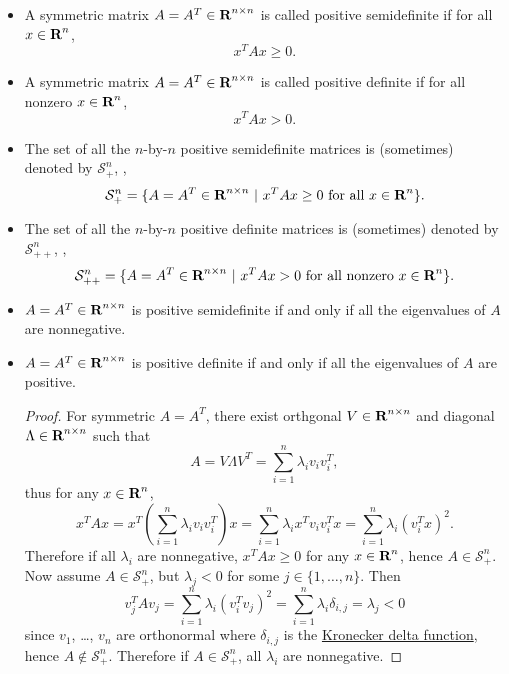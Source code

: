 \documentclass[10pt, twoside]{book}   	%
\newcommand{\possemidefset}[1]{\mathcal{S}_+^{#1}}
\newcommand{\posdefset}[1]{\mathcal{S}_{++}^{#1}}
\begin{document}
\begin{itemize}

\item
A symmetric matrix $A=A^T\in{\mbox{\bf R}}^{n\times n}$ is called positive semidefinite if for all $x\in{\mbox{\bf R}}^n$,
\begin{equation}
x^T A x \geq 0.
\end{equation}

\item
A symmetric matrix $A=A^T\in{\mbox{\bf R}}^{n\times n}$ is called positive definite if for all nonzero $x\in{\mbox{\bf R}}^n$,
\begin{equation}
x^T A x > 0.
\end{equation}

\item The set of all the $n$-by-$n$ positive semidefinite matrices is (sometimes) denoted by $\possemidefset{n}$,
\ie,
\begin{equation}
\possemidefset{n} = \set{A=A^T\in\reals^{n\times n}}{x^T A x \geq 0 \mbox{ for all } x \in \reals^n}.
\end{equation}

\item The set of all the $n$-by-$n$ positive definite matrices is (sometimes) denoted by $\posdefset{n}$,
\ie,
\begin{equation}
\posdefset{n} = \set{A=A^T\in\reals^{n\times n}}{x^T A x > 0 \mbox{ for all nonzero } x \in \reals^n}.
\end{equation}

\item $A=A^T\in{\mbox{\bf R}}^{n\times n}$ is positive semidefinite if and only if all the eigenvalues of $A$ are nonnegative.

\item $A=A^T\in{\mbox{\bf R}}^{n\times n}$ is positive definite if and only if all the eigenvalues of $A$ are positive.

\begin{proof}
For symmetric $A=A^T$, there exist orthgonal $V\in{\mbox{\bf R}}^{n\times n}$ and diagonal $\Lambda\in{\mbox{\bf R}}^{n\times n}$
such that
\[
A = V \Lambda V^T = \sum_{i=1}^n \lambda_i v_i v_i^T,
\]
thus for any $x\in{\mbox{\bf R}}^n$,
\[
x^T A x = x^T \left(\sum_{i=1}^n \lambda_i v_i v_i^T \right) x
= \sum_{i=1}^n \lambda_i x^T v_i v_i^T x
= \sum_{i=1}^n \lambda_i (v_i^T x)^2.
\]
Therefore if all $\lambda_i$ are nonnegative, $x^T A x\geq0$ for any $x\in{\mbox{\bf R}}^n$, hence $A\in\possemidefset{n}$.
Now assume $A\in\possemidefset{n}$, but $\lambda_j < 0$ for some $j\in\{1,\ldots,n\}$.
Then
\begin{equation}
v_j^T A v_j
= \sum_{i=1}^n \lambda_i (v_i^T v_j)^2
= \sum_{i=1}^n \lambda_i \delta_{i,j}
= \lambda_j < 0
\end{equation}
since $v_1$, \ldots, $v_n$ are orthonormal
where
$\delta_{i,j}$ is the \href{https://en.wikipedia.org/wiki/Kronecker_delta}{Kronecker delta function},
hence $A\not \in \possemidefset{n}$.
Therefore if $A\in\possemidefset{n}$, all $\lambda_i$ are nonnegative.


\end{proof}
\end{itemize}
\end{document}
